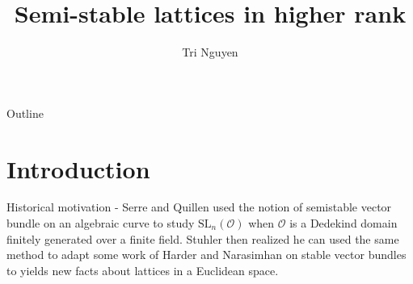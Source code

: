 \documentclass[pdf]{beamer}
\title{Semi-stable lattices in higher rank}
\author{Tri Nguyen}
\begin{document}
\begin{frame}
    \titlepage
\end{frame}

\begin{frame}{Outline}
    \tableofcontents
\end{frame}

\section{Introduction}
\begin{frame}{Historical motivation - \cite{grayson1984reduction}}
    Serre and Quillen used the notion of semistable vector
    bundle on an algebraic curve to study $\text{SL}_n(\mathcal{O})$ when $\mathcal{O}$ is a Dedekind domain finitely generated over a finite field. Stuhler
    then realized he can used the same method to adapt some work of Harder and Narasimhan on stable vector bundles to yields new facts
    about lattices in a Euclidean space.
\end{frame}
\end{document}
